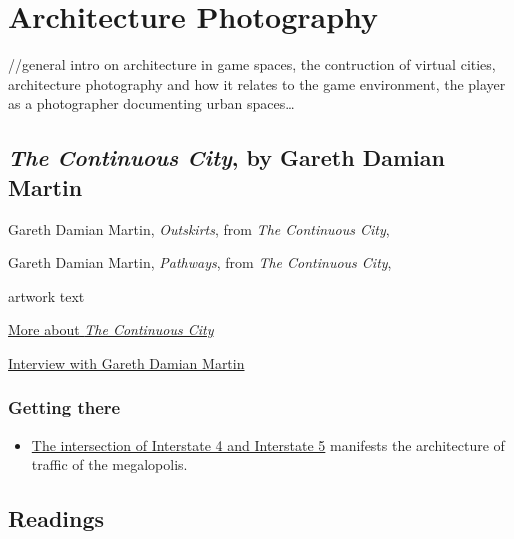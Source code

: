 \documentclass[
  openany]{book}
\providecommand{\tightlist}{%
  \setlength{\itemsep}{0pt}\setlength{\parskip}{0pt}}
\begin{document}
\hypertarget{architecture-photography}{%
\chapter{Architecture Photography}\label{architecture-photography}}

//general intro on architecture in game spaces, the contruction of virtual cities, architecture photography and how it relates to the game environment, the player as a photographer documenting urban spaces\ldots{}

\hypertarget{the-continuous-city-by-gareth-damian-martin}{%
\section*{\texorpdfstring{\emph{The Continuous City}, by Gareth Damian Martin}{The Continuous City, by Gareth Damian Martin}}\label{the-continuous-city-by-gareth-damian-martin}}

Gareth Damian Martin, \emph{Outskirts}, from \emph{The Continuous City},

Gareth Damian Martin, \emph{Pathways}, from \emph{The Continuous City},

artwork text

\href{https://socks-studio.com/2019/10/13/gareth-damian-martin-postcards-from-the-continuous-city-2018/}{More about \emph{The Continuous City}}

\href{https://www.gamescenes.org/2018/04/interview-gareth-damian-martin-the-aesthetics-of-analogue-game-photography.html}{Interview with Gareth Damian Martin}

\hypertarget{getting-there}{%
\subsection*{Getting there}\label{getting-there}}

\begin{itemize}
\tightlist
\item
  \href{https://grandtheftdata.com/landmarks/\#951.507,-1144.265,4,atlas,name=trainyard_warehouse,Trainyard_Warehouse,_East_Los_Santos}{The intersection of Interstate 4 and Interstate 5} manifests the architecture of traffic of the megalopolis.
\end{itemize}

\hypertarget{readings}{%
\section*{Readings}\label{readings}}
\end{document}
